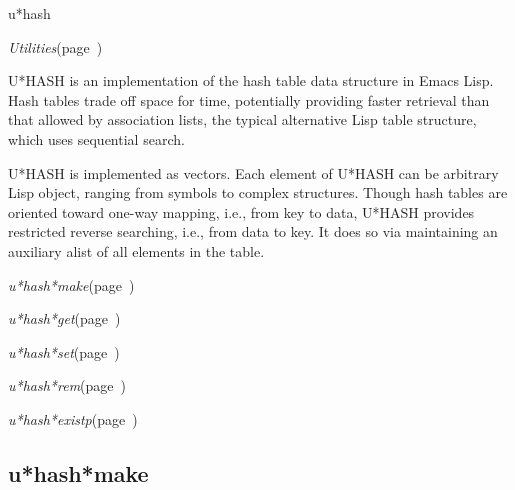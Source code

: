 \begin{description}
\item [Name:]  u*hash

\item [Layer:]
{\sl Utilities}\hfill(page~\pageref{Utilities})

\item [Description:]

U*HASH is an implementation of the hash table data
structure in Emacs Lisp. Hash tables trade off space for
time, potentially providing faster retrieval than that
allowed by association lists, the typical alternative
Lisp table structure, which uses sequential search.

U*HASH is implemented as vectors. Each element of U*HASH
can be arbitrary Lisp object, ranging from symbols to
complex structures. Though hash tables are oriented
toward one-way mapping, i.e., from key to data,
U*HASH provides restricted reverse searching, i.e., from
data to key. It does so via maintaining an auxiliary
alist of all elements in the table.

\item [Attributes:]

\item [Operations:]
\item {\sl u*hash*make}\hfill(page~\pageref{u*hash*make})
\item {\sl u*hash*get}\hfill(page~\pageref{u*hash*get})
\item {\sl u*hash*set}\hfill(page~\pageref{u*hash*set})
\item {\sl u*hash*rem}\hfill(page~\pageref{u*hash*rem})
\item {\sl u*hash*existp}\hfill(page~\pageref{u*hash*existp})

\item [Collections:]

\item [Subclasses:]

\item [Superclasses:]

\item [Instances:]



\end{description}
\horizontalline

\subsection{u*hash*make}
\label{u*hash*make}

